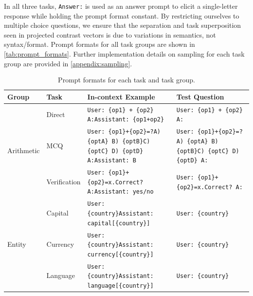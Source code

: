 \documentclass[11pt]{article}
\begin{document}
In all three tasks, \texttt{Answer:} is used as an answer prompt to elicit a single-letter response while holding the prompt format constant. By restricting ourselves to multiple choice questions, we ensure that the separation and task superposition seen in projected contrast vectors is due to variations in semantics, not syntax/format. Prompt formats for all task groups are shown in \autoref{tab:prompt_formats}. Further implementation details on sampling for each task group are provided in \autoref{appendix:sampling}.

\begin{table}[t]
\centering
\small
\renewcommand{\arraystretch}{1.4}
\caption{Prompt formats for each task and task group.}
\label{tab:prompt_formats}
\begin{tabular}{llp{}p{}}
\toprule
\textbf{Group} & \textbf{Task} & \textbf{In-context Example} & \textbf{Test Question} \\
\midrule
\multirow{3}{*}{Arithmetic}
  & Direct
  & \texttt{User: \{op1\} + \{op2\} A:}\newline\texttt{Assistant: \{op1+op2\}}
  & \texttt{User: \{op1\} + \{op2\} A:} \\[3ex]
  & MCQ
  & \texttt{User: \{op1\}+\{op2\}=?}\newline\texttt{A) \{optA\} B) \{optB\}}\newline\texttt{C) \{optC\} D) \{optD\} A:}\newline\texttt{Assistant: B}
  & \texttt{User: \{op1\}+\{op2\}=?}\newline\texttt{A) \{optA\} B) \{optB\}}\newline\texttt{C) \{optC\} D) \{optD\} A:} \\[3ex]
  & Verification
  & \texttt{User: \{op1\}+\{op2\}=x.}\newline\texttt{Correct? A:}\newline\texttt{Assistant: yes/no}
  & \texttt{User: \{op1\}+\{op2\}=x.}\newline\texttt{Correct? A:} \\
\midrule
\multirow{3}{*}{Entity}
    & Capital
    & \texttt{User: \{country\}}\newline\texttt{Assistant: capital[\{country\}]} & \texttt{User: \{country\}} \\[3ex]
    & Currency
    & \texttt{User: \{country\}}\newline\texttt{Assistant: currency[\{country\}]} & \texttt{User: \{country\}} \\[3ex]
    & Language 
    & \texttt{User: \{country\}}\newline\texttt{Assistant: language[\{country\}]} & \texttt{User: \{country\}} \\

\end{tabular}
\end{table}
\end{document}
